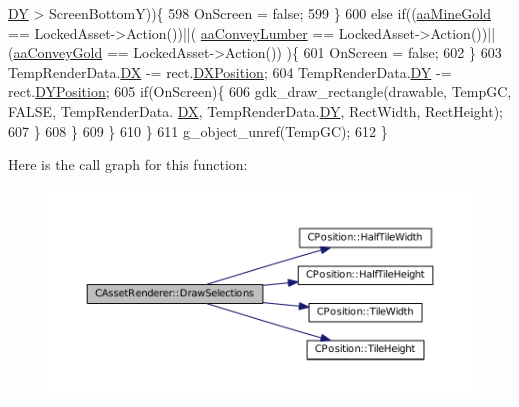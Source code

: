 \begin{DoxyCode}
      \hyperlink{structSAssetRenderData_af27e8a46e21a0935983bfc0d34d9ceba}{DY} > ScreenBottomY))\{
598                     OnScreen = \textcolor{keyword}{false};
599                 \}
600                 \textcolor{keywordflow}{else} \textcolor{keywordflow}{if}((\hyperlink{GameDataTypes_8h_ab47668e651a3032cfb9c40ea2d60d670abc45b1c4fbca1481e373a780a69bd56b}{aaMineGold} == LockedAsset->Action())||(
      \hyperlink{GameDataTypes_8h_ab47668e651a3032cfb9c40ea2d60d670a7b0954302f27f46b3fdf6fddd530d154}{aaConveyLumber} == LockedAsset->Action())||(\hyperlink{GameDataTypes_8h_ab47668e651a3032cfb9c40ea2d60d670ae80ac4dde60023e0a1794e994db7000a}{aaConveyGold} == LockedAsset->Action())
      )\{
601                     OnScreen = \textcolor{keyword}{false};
602                 \}
603                 TempRenderData.\hyperlink{structSAssetRenderData_ab432edfd1146e38a92576b78e2ad5581}{DX} -= rect.\hyperlink{structSRectangle_abcbddb03b3ee416cc33109833b5f075c}{DXPosition};
604                 TempRenderData.\hyperlink{structSAssetRenderData_af27e8a46e21a0935983bfc0d34d9ceba}{DY} -= rect.\hyperlink{structSRectangle_a120aa0a90033bc6e07c36c151a3bbc71}{DYPosition};
605                 \textcolor{keywordflow}{if}(OnScreen)\{
606                     gdk\_draw\_rectangle(drawable, TempGC, FALSE, TempRenderData.
      \hyperlink{structSAssetRenderData_ab432edfd1146e38a92576b78e2ad5581}{DX}, TempRenderData.\hyperlink{structSAssetRenderData_af27e8a46e21a0935983bfc0d34d9ceba}{DY}, RectWidth, RectHeight);
607                 \}
608             \}
609         \}
610     \}
611     g\_object\_unref(TempGC);
612 \}
\end{DoxyCode}
Here is the call graph for this function\+:\nopagebreak
\begin{figure}[H]
\begin{center}
\leavevmode
\includegraphics[width=350pt]{classCAssetRenderer_ad9e2ab45919abbec23871b85a95ba8cf_cgraph}
\end{center}
\end{figure}
\hypertarget{classCAssetRenderer_a06e45891dcbc0a88570c537a4d6906c8}{}\label{classCAssetRenderer_a06e45891dcbc0a88570c537a4d6906c8} 
